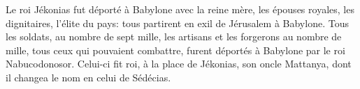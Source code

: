 Le roi Jékonias fut déporté à Babylone avec la reine mère,
	les épouses royales, les dignitaires, l’élite du pays:
	tous partirent en exil de Jérusalem à Babylone.
Tous les soldats, au nombre de sept mille,
	les artisans et les forgerons au nombre de mille,
	tous ceux qui pouvaient combattre,
	furent déportés à Babylone par le roi Nabucodonosor.
Celui-ci fit roi, à la place de Jékonias, son oncle Mattanya,
	dont il changea le nom en celui de Sédécias.
